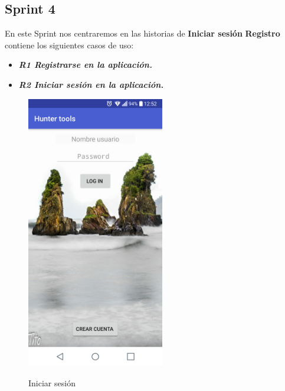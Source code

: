 \subsection{Sprint 4}

En este Sprint nos centraremos en las historias de  \textbf{Iniciar sesión }
\textbf{Registro} contiene los siguientes casos de uso:



\begin{itemize}
\item\textbf{ \textit{R1  Registrarse en la aplicación.}}
\item \textbf{\textit{R2 Iniciar sesión en la aplicación. }}

\end{itemize} 
\begin{figure}[htbp]
\begin{minipage}[b]{0.5\linewidth} %
\centering
\includegraphics[width=6cm]{capturamovil/login.png}
 \label{figura1}
\caption{Iniciar sesión }


\end{minipage}
\end{figure}
